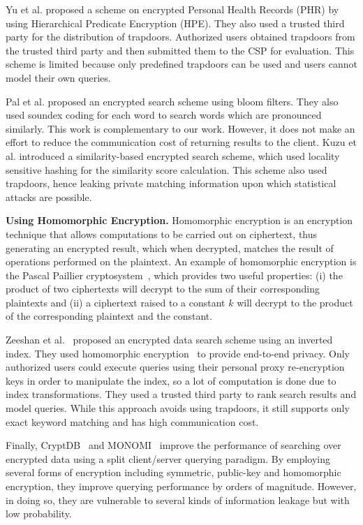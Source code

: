 Yu et al. \cite{li} proposed a scheme on encrypted Personal Health Records
(PHR) by using Hierarchical Predicate Encryption (HPE). They also used a 
trusted third party for the distribution of trapdoors. 
Authorized users obtained trapdoors from the trusted third party and then 
submitted them to the CSP for evaluation. This scheme is limited because only 
predefined trapdoors can be used and users cannot model their own queries.

Pal et al. \cite{saibal} proposed an encrypted search scheme using bloom filters. They
also used soundex coding\cite{odell1918soundex} for each word to search words
which are pronounced similarly. This work is complementary to our work. However, it
does not make an effort to reduce the communication cost of returning results to the
client. Kuzu et al.\cite{mehmat} introduced a similarity-based encrypted search scheme,
which used locality sensitive hashing for the similarity score calculation.
This scheme also used trapdoors, hence leaking private matching information
upon which statistical attacks are possible. 


\textbf{Using Homomorphic Encryption.}
Homomorphic encryption is an encryption technique that
allows computations to be carried out on ciphertext, thus generating an 
encrypted result, which when decrypted, matches the result of operations performed 
on the plaintext. An example of homomorphic encryption is the Pascal Paillier 
cryptosystem~\cite{pascal}, which provides two useful properties: 
(i) the product of two ciphertexts will decrypt to the sum of their corresponding plaintexts
and (ii) a ciphertext raised to a constant $k$ will decrypt to the product of the 
corresponding plaintext and the constant.

Zeeshan et al.~\cite{zeehan} proposed an encrypted data search scheme using an inverted index.
They used homomorphic encryption~\cite{craig} to provide end-to-end privacy. Only
authorized users could execute queries using their personal proxy re-encryption keys in
order to manipulate the index, so a lot of computation is done due to index
transformations. They used a trusted third party to rank search results and model queries.
While this approach avoids using trapdoors, it still supports only
exact keyword matching and has high communication cost.

Finally, CryptDB~\cite{popa2011cryptdb} and MONOMI~\cite{tu2013processing} improve the performance of searching over encrypted data using
a split client/server querying paradigm. By employing several forms of encryption including
symmetric, public-key and homomorphic encryption, they improve querying performance by orders
of magnitude. However, in doing so, they are vulnerable to several kinds of information leakage 
but with low probability.
